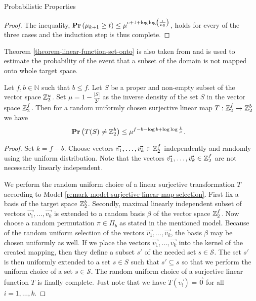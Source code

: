\begin{section}{Probabilistic Properties}
\begin{proof}
The inequality, $\mathbf{Pr}\left(\mu_{k + 1} \geq t\right) \leq \mu ^ {c + 1 + \log \log \left( \frac{1}{\mu_0} \right)}$, holds for every of the three cases and the induction step is thus complete.
\end{proof}

Theorem \ref{theorem-linear-function-set-onto} is also taken from \cite{DBLP:books/sp/Mehlhorn84} and is used to estimate the probability of the event that a subset of the domain is not mapped onto whole target space.

\begin{theorem}
\label{theorem-linear-function-set-onto}
Let $f, b \in \mathbb{N}$ such that $b \leq f$. Let $S$ be a proper and non-empty subset of the vector space $\mathbb{Z}_{2}^{u}$. Set $\mu = 1 - \frac{|S|}{2 ^ f}$ as the inverse density of the set $S$ in the vector space $\mathbb{Z}_{2}^{f}$. Then for a random uniformly chosen surjective linear map $T: \mathbb{Z}_{2}^{f} \rightarrow \mathbb{Z}_{2}^{b}$ we have
\[
	\mathbf{Pr}\left(T(S) \neq \mathbb{Z}_{2}^{b}\right) \leq \mu^{f - b - \log b + \log \log \frac{1}{\mu}} \text{.}
\]
\end{theorem}
\begin{proof}
Set $k = f - b$. Choose vectors $\vec{v_1}, \dots, \vec{v_k} \in \mathbb{Z}_{2}^{f}$ independently and randomly using the uniform distribution. Note that the vectors $\vec{v_1}, \dots, \vec{v_k} \in \mathbb{Z}_{2}^{f}$ are not necessarily linearly independent.

We perform the random uniform choice of a linear surjective transformation $T$ according to Model \ref{remark-model-surjective-linear-map-selection}. First fix a basis of the target space $\mathbb{Z}_{2}^{b}$. Secondly, maximal linearly independent subset of vectors $\vec{v_1}, \dots, \vec{v_k}$ is extended to a random basis $\beta$ of the vector space $\mathbb{Z}_{2}^{f}$. Now choose a random permutation $\pi \in \Pi_b$ as stated in the mentioned model. Because of the random uniform selection of the vectors $\vec{v_1}, \dots, \vec{v_k}$, the basis $\beta$ may be chosen uniformly as well. If we place the vectors $\vec{v_1}, \dots, \vec{v_k}$ into the kernel of the created mapping, then they define a subset $s'$ of the needed set $s \in \mathcal{S}$. The set $s'$ is then uniformly extended to a set $s \in S$ such that $s' \subseteq s$ so that we perform the uniform choice of a set $s \in \mathcal{S}$. The random uniform choice of a surjective linear function $T$ is finally complete. Just note that we have $T(\vec{v_i}) = \vec{0}$ for all $i = 1, \dots, k$.	


\end{proof}
\end{section}

